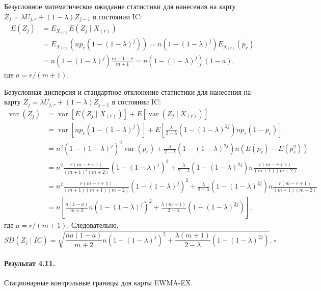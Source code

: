 Безусловное математическое ожидание статистики для нанесения на карту \(Z_j = \lambda U_{j,r} + (1 - \lambda)Z_{j-1}\) в состоянии IC:
\begin{align*}
	E(Z_j) &= E_{X_{(r)}} E\left( Z_j \mid X_{(r)} \right) \\
	       &= E_{X_{(r)}}\left( np_r\left( 1 - (1 - \lambda)^j \right) \right) = n\left( 1 - (1 - \lambda)^j \right)E_{X_{(r)}}(p_r) \\
	       &= n\left( 1 - (1 - \lambda)^j \right)\frac{m + 1 - r}{m + 1} = n\left( 1 - (1 - \lambda)^j \right)(1 - a),
\end{align*}
где \(a = r/(m + 1)\).

Безусловная дисперсия и стандартное отклонение статистики для нанесения на карту \(Z_j = \lambda U_{j,r} + (1 - \lambda)Z_{j-1}\) в состоянии IC:
\begin{align*}
	\operatorname{var}(Z_j) &= \operatorname{var}\left[ E\left( Z_j \mid X_{(r)} \right) \right] + E\left[ \operatorname{var}\left( Z_j \mid X_{(r)} \right) \right] \\
	&= \operatorname{var}\left[ np_r\left( 1 - (1 - \lambda)^j \right) \right] + E\left[ \frac{\lambda}{2 - \lambda}\left( 1 - (1 - \lambda)^{2j} \right)np_r(1 - p_r) \right] \\
	&= n^2\left( 1 - (1 - \lambda)^j \right)^2\operatorname{var}(p_r) + \frac{\lambda}{2 - \lambda}\left( 1 - (1 - \lambda)^{2j} \right)n\left( E(p_r) - E\left( p_r^2 \right) \right) \\
	&= n^2\frac{r(m - r + 1)}{(m + 1)^2(m + 2)}\left( 1 - (1 - \lambda)^j \right)^2 + \frac{\lambda}{2 - \lambda}\left( 1 - (1 - \lambda)^{2j} \right)n\frac{r(m - r + 1)}{(m + 1)(m + 2)} \\
	&= n^2\frac{r(m - r + 1)}{(m + 1)(m + 1)(m + 2)}\left( 1 - (1 - \lambda)^j \right)^2 + \frac{\lambda}{2 - \lambda}\left( 1 - (1 - \lambda)^{2j} \right)n\frac{r(m - r + 1)}{(m + 1)(m + 2)} \\
	&= n\left[ \frac{a(1 - a)}{m + 2}n\left( 1 - (1 - \lambda)^j \right)^2 + \frac{\lambda(m + 1)}{2 - \lambda}\left( 1 - (1 - \lambda)^{2j} \right) \right],
\end{align*}
где \(a = r/(m + 1)\). Следовательно,
\[
	SD(Z_j \mid IC) = \sqrt{\frac{na(1 - a)}{m + 2}n\left( 1 - (1 - \lambda)^j \right)^2 + \frac{\lambda(m + 1)}{2 - \lambda}\left( 1 - (1 - \lambda)^{2j} \right)}. \ \square
\]

\paragraph{Результат 4.11.} Стационарные контрольные границы для карты EWMA-EX.


